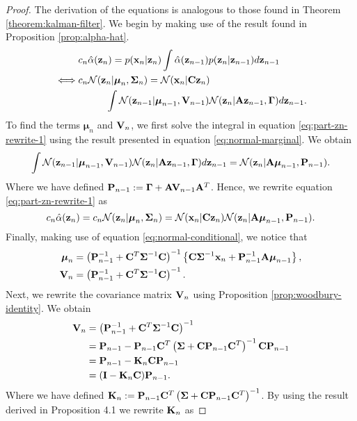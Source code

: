 \documentclass[11pt]{article}
\numberwithin{equation}{section}
\newcommand{\x}{{\bf x}}
\newcommand{\z}{{\bf z}}
\newcommand{\N}{\mathcal{N}}
\begin{document}
\begin{proof}
	The derivation of the equations is analogous to those found in Theorem \ref{theorem:kalman-filter}. We begin by making use of the result found in Proposition \ref{prop:alpha-hat}. 
	\begin{align}
		&c_n \hat\alpha(\z_n) = p(\x_n\vert\z_n) \int \hat\alpha(\z_{n-1})p(\z_n \vert \z_{n-1}) d\z_{n-1}\\
		\iff& c_n \N(\z_n \vert \boldsymbol\mu_n, \boldsymbol\Sigma_n) = \N(\x_n \vert {\bf C}\z_n) \nonumber \\
			&\hspace{1cm} \int \N(\z_{n-1} \vert \boldsymbol\mu_{n-1}, {\bf V}_{n-1}) \N(\z_n \vert {\bf A}\z_{n-1}, \boldsymbol\Gamma) d\z_{n-1} \label{eq:part-zn-rewrite-1}.
	\end{align}
	To find the terms $\boldsymbol\mu_n$ and ${\bf V}_n$, we first solve the integral in equation \eqref{eq:part-zn-rewrite-1} using the result presented in equation \eqref{eq:normal-marginal}. We obtain
	\begin{equation}
		\int \N(\z_{n-1} \vert \boldsymbol\mu_{n-1}, {\bf V}_{n-1}) \N(\z_n \vert {\bf A}\z_{n-1}, \boldsymbol\Gamma) d\z_{n-1} = \N(\z_n \vert {\bf A} \boldsymbol\mu_{n-1}, {\bf P}_{n-1}).
	\end{equation}
	Where we have defined ${\bf P}_{n-1} := \boldsymbol\Gamma + {\bf A}{\bf V}_{n-1}{\bf A}^T$. Hence, we rewrite equation \eqref{eq:part-zn-rewrite-1} as 
	\begin{equation} \label{eq:part-cnzn-rewrite}
		c_n\hat\alpha(\z_n)  = c_n \N(\z_n \vert \boldsymbol\mu_n, \boldsymbol\Sigma_n) = \N(\x_n \vert {\bf C}\z_n)  \N(\z_n \vert {\bf A} \boldsymbol\mu_{n-1}, {\bf P}_{n-1}).
	\end{equation}
	Finally, making use of equation \eqref{eq:normal-conditional}, we notice that
	\begin{align}
		\boldsymbol{\mu}_n &= \left({\bf P}_{n-1}^{-1} + {\bf C}^T \boldsymbol\Sigma^{-1}{\bf C}\right)^{-1} \left\{{\bf C}\boldsymbol\Sigma^{-1}\x_n + {\bf P}_{n-1}^{-1}{\bf A}\boldsymbol\mu_{n-1}\right\},\\
		{\bf V}_n &= \left({\bf P}_{n-1}^{-1} + {\bf C}^T \boldsymbol\Sigma^{-1}{\bf C}\right)^{-1}.
	\end{align}
	Next, we rewrite the covariance matrix ${\bf V}_n$ using Proposition \ref{prop:woodbury-identity}. We obtain
	\begin{align}
		{\bf V}_n &= \left({\bf P}_{n-1}^{-1} + {\bf C}^T \boldsymbol\Sigma^{-1}{\bf C}\right)^{-1} \\
				  &= {\bf P}_{n-1} - {\bf P}_{n-1} {\bf C}^T\left(\boldsymbol\Sigma + {\bf C}{\bf P}_{n-1}{\bf C}^T\right)^{-1}{\bf C}{\bf P}_{n-1} \\
				  &= {\bf P}_{n-1} - {\bf K}_n{\bf C}{\bf P}_{n-1} \\
				  &= ({\bf I}- {\bf K}_n{\bf C}){\bf P}_{n-1}.
	\end{align}
	Where we have defined ${\bf K}_n := {\bf P}_{n-1} {\bf C}^T\left(\boldsymbol\Sigma + {\bf C}{\bf P}_{n-1}{\bf C}^T\right)^{-1}$. By using the result derived in Proposition 4.1 we rewrite ${\bf K}_n$ as
	

\end{proof}
\end{document}
